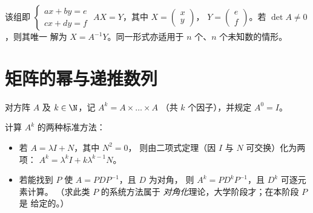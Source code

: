 \begin{method}[线性方程组]\label{met:g12:matrix:systems}
该组即
$\begin{cases} ax + by = e\\ cx + dy = f \end{cases}$
$AX = Y$，其中
$X = \begin{pmatrix} x \\ y\end{pmatrix}$，
$Y = \begin{pmatrix} e \\ f\end{pmatrix}$。若 $\det A \neq 0$，则其唯一
解为 $X = A^{-1}Y$。同一形式亦适用于
$n$ 个、$n$ 个未知数的情形。
\end{method}

\section{矩阵的幂与递推数列}

\begin{definition}\label{def:g12:matrix:power}
对方阵 $A$ 及 $k \in \N$，记 $A^k = A \times \dots \times A$
（共 $k$ 个因子），并规定 $A^0 = I$。
\end{definition}

\begin{method}[数量矩阵加幂零矩阵及可对角化的情形]\label{met:g12:matrix:powers}
计算 $A^k$ 的两种标准方法：
\begin{itemize}
  \item 若 $A = \lambda I + N$，其中 $N^2 = 0$，
        则由二项式定理（因 $I$ 与 $N$ 可交换）化为两项：
        $A^k = \lambda^k I + k \lambda^{k-1} N$。
  \item 若能找到 $P$ 使 $A = PDP^{-1}$，且 $D$ 为对角，
        则 $A^k = P D^k P^{-1}$，且 $D^k$ 可逐元素计算。
        （求此类 $P$ 的系统方法属于
        \emph{对角化}理论，大学阶段才；在本阶段 $P$ 是
        给定的。）
\end{itemize}
\end{method}

